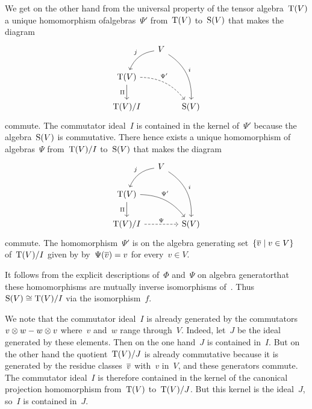 \begin{recall}
\begin{description}
\begin{itemize}
					We get on the other hand from the universal property of the tensor algebra~$\operatorname{T}(V)$ a unique homomorphism ofalgebras~$\Psi'$ from~$\operatorname{T}(V)$ to~$\operatorname{S}(V)$ that makes the diagram
					\[
						\begin{tikzcd}[column sep = small]
							{}
							&
							V
							\arrow[bend right]{dl}[above left]{j}
							\arrow[bend left]{ddr}[above right]{i}
							&
							{}
							\\
							\Tensor(V)
							\arrow[bend left=25, dashed]{drr}[above right, pos=0.35]{\Psi'}
							\arrow{d}[left]{\Pi}
							&
							{}
							&
							{}
							\\
							\Tensor(V)/I
							&
							{}
							&
							\Symm(V)
						\end{tikzcd}
					\]
					commute.
					The commutator ideal~$I$ is contained in the kernel of~$\Psi'$ because the algebra~$\operatorname{S}(V)$ is commutative.
					There hence exists a unique homomorphism of algebras~$\Psi$ from~$\operatorname{T}(V)/I$ to~$\operatorname{S}(V)$ that makes the diagram
					\[
						\begin{tikzcd}[column sep = small]
							{}
							&
							V
							\arrow[bend right]{dl}[above left]{j}
							\arrow[bend left]{ddr}[above right]{i}
							&
							{}
							\\
							\Tensor(V)
							\arrow[bend left=25]{drr}[above right, pos=0.37]{\Psi'}
							\arrow{d}[left]{\Pi}
							&
							{}
							&
							{}
							\\
							\Tensor(V)/I
							\arrow[dashed]{rr}[above]{\Psi}
							&
							{}
							&
							\Symm(V)
						\end{tikzcd}
					\]
					commute.
					The homomorphism~$\Psi'$ is on the algebra generating set~$\{ \class{v} \suchthat v \in V \}$ of~$\operatorname{T}(V) / I$ given by by~$\Psi(\overline{v}) = v$ for every~$v \in V$.
					
					It follows from the explicit descriptions of~$\Phi$ and~$\Psi$ on algebra generatorthat these homomorphisms are mutually inverse isomorphisms of~\algebras{$\kf$}.
					Thus~$\operatorname{S}(V) \cong \operatorname{T}(V)/I$ via the isomorphism~$f$.
					
					We note that the commutator ideal~$I$ is already generated by the commutators~$v \otimes w - w \otimes v$ where~$v$ and~$w$ range through~$V$.
					Indeed, let~$J$ be the ideal generated by these elements.
					Then on the one hand~$J$ is contained in~$I$.
					But on the other hand the quotient~$\operatorname{T}(V)/J$ is already commutative because it is generated by the residue classes~$\overline{v}$ with~$v$ in~$V$, and these generators commute.
					The commutator ideal~$I$ is therefore contained in the kernel of the canonical projection homomorphism from~$\operatorname{T}(V)$ to~$\operatorname{T}(V)/J$.
					But this kernel is the ideal~$J$, so~$I$ is contained in~$J$.
					

\end{itemize}
\end{description}
\end{recall}
